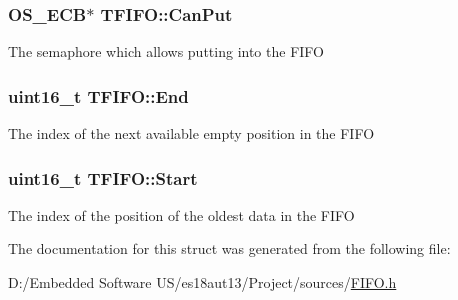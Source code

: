 \subsubsection[{Can\+Put}]{\setlength{\rightskip}{0pt plus 5cm}O\+S\+\_\+\+E\+C\+B$\ast$ T\+F\+I\+F\+O\+::\+Can\+Put}\label{struct_t_f_i_f_o_a9f4fd72a0313ed8a98e22198171c2fc5}
The semaphore which allows putting into the F\+I\+F\+O \hypertarget{struct_t_f_i_f_o_a5063b875898a6f23a97aa3ca17f0544b}{}
\subsubsection[{End}]{\setlength{\rightskip}{0pt plus 5cm}uint16\+\_\+t T\+F\+I\+F\+O\+::\+End}\label{struct_t_f_i_f_o_a5063b875898a6f23a97aa3ca17f0544b}
The index of the next available empty position in the F\+I\+F\+O \hypertarget{struct_t_f_i_f_o_a092a7559431a12616672354641908167}{}
\subsubsection[{Start}]{\setlength{\rightskip}{0pt plus 5cm}uint16\+\_\+t T\+F\+I\+F\+O\+::\+Start}\label{struct_t_f_i_f_o_a092a7559431a12616672354641908167}
The index of the position of the oldest data in the F\+I\+F\+O 

The documentation for this struct was generated from the following file\+:\begin{DoxyCompactItemize}
\item 
D\+:/\+Embedded Software U\+S/es18aut13/\+Project/sources/\hyperlink{_f_i_f_o_8h}{F\+I\+F\+O.\+h}\end{DoxyCompactItemize}
